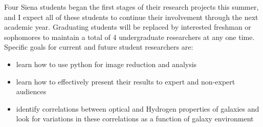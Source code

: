 \documentclass[11pt, preprint]{aastex}
\begin{document}
{%


Four Siena students began the first stages of their research projects this summer,
and I expect all of these students to continue their involvement through the next academic year.
Graduating students will be replaced by interested freshman or sophomores to maintain a total
of 4 undergraduate researchers at any one time.  
Specific goals for current and future student researchers are:
\vspace*{-.2cm}
\begin{itemize}
\vspace*{-.25cm}\item learn how to use python for image reduction and
analysis 
\vspace*{-.25cm}\item learn how to effectively present their results to expert and
non-expert audiences
\vspace*{-.25cm}\item identify correlations between optical and Hydrogen properties of galaxies and look for variations in these correlations as a function of galaxy environment
\end{itemize}
\vspace*{-.2cm}


}
\end{document}
